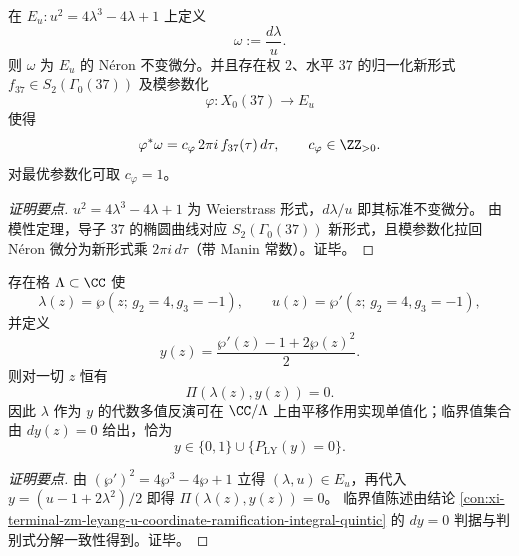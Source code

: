 \begin{conclusion}\label{con:xi-terminal-zm-leyang-u-coordinate-neron-modular-pullback}
在 \(E_u:u^2=4\lambda^3-4\lambda+1\) 上定义
\[
\omega:=\frac{d\lambda}{u}.
\]
则 \(\omega\) 为 \(E_u\) 的 Néron 不变微分。并且存在权 \(2\)、水平 \(37\) 的归一化新形式
\(f_{37}\in S_2(\Gamma_0(37))\) 及模参数化
\[
\varphi:X_0(37)\to E_u
\]
使得
\[
\varphi^*\omega=c_\varphi\,2\pi i\,f_{37}(\tau)\,d\tau,\qquad c_\varphi\in\ZZ_{>0}.
\]
对最优参数化可取 \(c_\varphi=1\)。
\end{conclusion}
\begin{proof}[证明要点]
\(u^2=4\lambda^3-4\lambda+1\) 为 Weierstrass 形式，\(d\lambda/u\) 即其标准不变微分。
由模性定理，导子 \(37\) 的椭圆曲线对应 \(S_2(\Gamma_0(37))\) 新形式，且模参数化拉回 Néron 微分为新形式乘 \(2\pi i\,d\tau\)（带 Manin 常数）。证毕。
\end{proof}

\begin{conclusion}\label{con:xi-terminal-zm-leyang-u-coordinate-weierstrass-uniformization}
存在格 \(\Lambda\subset\CC\) 使
\[
\lambda(z)=\wp(z;\,g_2=4,g_3=-1),\qquad
u(z)=\wp'(z;\,g_2=4,g_3=-1),
\]
并定义
\[
y(z)=\frac{\wp'(z)-1+2\wp(z)^2}{2}.
\]
则对一切 \(z\) 恒有
\[
\Pi(\lambda(z),y(z))=0.
\]
因此 \(\lambda\) 作为 \(y\) 的代数多值反演可在 \(\CC/\Lambda\) 上由平移作用实现单值化；临界值集合由 \(dy(z)=0\) 给出，恰为
\[
y\in\{0,1\}\cup\{P_{\mathrm{LY}}(y)=0\}.
\]
\end{conclusion}
\begin{proof}[证明要点]
由 \((\wp')^2=4\wp^3-4\wp+1\) 立得 \((\lambda,u)\in E_u\)，再代入
\(
y=(u-1+2\lambda^2)/2
\)
即得 \(\Pi(\lambda(z),y(z))=0\)。
临界值陈述由结论 \ref{con:xi-terminal-zm-leyang-u-coordinate-ramification-integral-quintic} 的 \(dy=0\) 判据与判别式分解一致性得到。证毕。
\end{proof}
